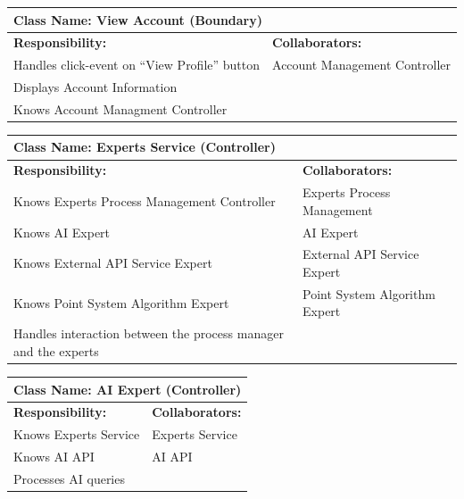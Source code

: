 \documentclass[]{article}
\begin{document}
\begin{table}[H]
  \centering
  \renewcommand{\arraystretch}{1.3} %
  \begin{tabular}{|p{7.5cm}|p{7.5cm}|}
    \hline
    \multicolumn{2}{|l|}{\textbf{Class Name: View Account (Boundary)}}           \\
    \hline
    \textbf{Responsibility:}                     & \textbf{Collaborators:}       \\
    \hline
    Handles click-event on “View Profile” button & Account Management Controller \\
    Displays Account Information                 &                               \\
    Knows Account Managment Controller           &                               \\
    \hline
  \end{tabular}
\end{table}
\begin{table}[H]
  \centering
  \renewcommand{\arraystretch}{1.3} %
  \begin{tabular}{|p{7.5cm}|p{7.5cm}|}
    \hline
    \multicolumn{2}{|l|}{\textbf{Class Name: Experts Service (Controller)}}                         \\
    \hline
    \textbf{Responsibility:}                                        & \textbf{Collaborators:}       \\
    \hline
    Knows Experts Process Management Controller                     & Experts Process Management    \\
    Knows AI Expert                                                 & AI Expert                     \\
    Knows External API Service Expert                               & External API Service Expert   \\
    Knows Point System Algorithm Expert                             & Point System Algorithm Expert \\
    Handles interaction between the process manager and the experts &                               \\
    \hline
  \end{tabular}
\end{table}
\begin{table}[H]
  \centering
  \renewcommand{\arraystretch}{1.3} %
  \begin{tabular}{|p{7.5cm}|p{7.5cm}|}
    \hline
    \multicolumn{2}{|l|}{\textbf{Class Name: AI Expert (Controller)}} \\
    \hline
    \textbf{Responsibility:} & \textbf{Collaborators:}                \\
    \hline
    Knows Experts Service    & Experts Service                        \\
    Knows AI API             & AI API                                 \\
    Processes AI queries     &                                        \\
    \hline
  \end{tabular}
\end{table}
\end{document}
